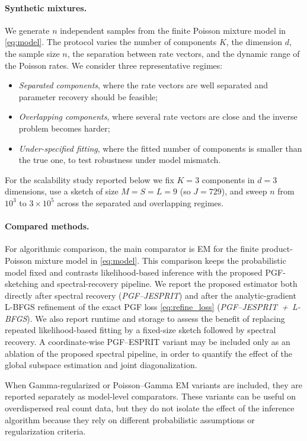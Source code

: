 \documentclass[sigconf,natbib=true,anonymous=true,review=true]{acmart}
\begin{document}
\paragraph{Synthetic mixtures.}
We generate $n$ independent samples from the finite Poisson mixture model in \eqref{eq:model}. 
The protocol varies the number of components $K$, the dimension $d$, the sample size $n$, the separation between rate vectors, and the dynamic range of the Poisson rates. 
We consider three representative regimes:
\begin{itemize}[leftmargin=*]
    \item \emph{Separated components}, where the rate vectors are well separated and parameter recovery should be feasible;
    \item \emph{Overlapping components}, where several rate vectors are close and the inverse problem becomes harder;
    \item \emph{Under-specified fitting}, where the fitted number of components is smaller than the true one, to test robustness under model mismatch.
\end{itemize}
For the scalability study reported below we fix $K=3$ components in $d=3$ dimensions,
use a sketch of size $M=S=L=9$ (so $J=729$), and sweep $n$ from $10^3$ to
$3\times10^5$ across the separated and overlapping regimes.

\paragraph{Compared methods.}
For algorithmic comparison, the main comparator is EM for the finite product-Poisson mixture model in \eqref{eq:model}.
This comparison keeps the probabilistic model fixed and contrasts likelihood-based inference with the proposed PGF-sketching and spectral-recovery pipeline.
We report the proposed estimator both directly after spectral recovery (\emph{PGF--JESPRIT}) and after the analytic-gradient L-BFGS refinement of the exact PGF loss \eqref{eq:refine_loss} (\emph{PGF--JESPRIT~+~L-BFGS}).
We also report runtime and storage to assess the benefit of replacing repeated likelihood-based fitting by a fixed-size sketch followed by spectral recovery.
A coordinate-wise PGF--ESPRIT variant may be included only as an ablation of the proposed spectral pipeline, in order to quantify the effect of the global subspace estimation and joint diagonalization.

When Gamma-regularized or Poisson--Gamma EM variants are included, they are reported separately as model-level comparators. 
These variants can be useful on overdispersed real count data, but they do not isolate the effect of the inference algorithm because they rely on different probabilistic assumptions or regularization criteria.
\end{document}
